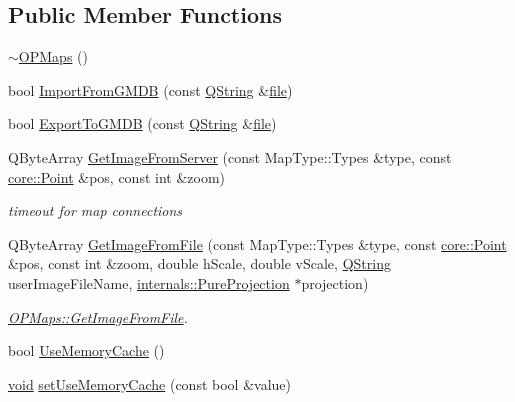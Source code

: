 \subsection*{\-Public \-Member \-Functions}
\begin{DoxyCompactItemize}
\item 
\hyperlink{group___o_p_map_widget_ga7f09b75dc945740e40b6c0fa28998c51}{$\sim$\-O\-P\-Maps} ()
\item 
bool \hyperlink{group___o_p_map_widget_ga50b468c09bac4de46905661839aa2477}{\-Import\-From\-G\-M\-D\-B} (const \hyperlink{group___u_a_v_objects_plugin_gab9d252f49c333c94a72f97ce3105a32d}{\-Q\-String} \&\hyperlink{uavobjecttemplate_8m_a97c04efa65bcf0928abf9260bc5cbf46}{file})
\item 
bool \hyperlink{group___o_p_map_widget_ga0e08ede04e7f73ba867d870516a3da12}{\-Export\-To\-G\-M\-D\-B} (const \hyperlink{group___u_a_v_objects_plugin_gab9d252f49c333c94a72f97ce3105a32d}{\-Q\-String} \&\hyperlink{uavobjecttemplate_8m_a97c04efa65bcf0928abf9260bc5cbf46}{file})
\item 
\-Q\-Byte\-Array \hyperlink{group___o_p_map_widget_ga03e1a814248920f31520f38e2ed5d412}{\-Get\-Image\-From\-Server} (const \-Map\-Type\-::\-Types \&type, const \hyperlink{structcore_1_1_point}{core\-::\-Point} \&pos, const int \&zoom)
\begin{DoxyCompactList}\small\item\em timeout for map connections \end{DoxyCompactList}\item 
\-Q\-Byte\-Array \hyperlink{group___o_p_map_widget_gae60565be4288e3fca3f28642b38d93ea}{\-Get\-Image\-From\-File} (const \-Map\-Type\-::\-Types \&type, const \hyperlink{structcore_1_1_point}{core\-::\-Point} \&pos, const int \&zoom, double h\-Scale, double v\-Scale, \hyperlink{group___u_a_v_objects_plugin_gab9d252f49c333c94a72f97ce3105a32d}{\-Q\-String} user\-Image\-File\-Name, \hyperlink{classinternals_1_1_pure_projection}{internals\-::\-Pure\-Projection} $\ast$projection)
\begin{DoxyCompactList}\small\item\em \hyperlink{group___o_p_map_widget_gae60565be4288e3fca3f28642b38d93ea}{\-O\-P\-Maps\-::\-Get\-Image\-From\-File}. \end{DoxyCompactList}\item 
bool \hyperlink{group___o_p_map_widget_ga2645fe8a750602f5aaa9258af2d7d63e}{\-Use\-Memory\-Cache} ()
\item 
\hyperlink{group___u_a_v_objects_plugin_ga444cf2ff3f0ecbe028adce838d373f5c}{void} \hyperlink{group___o_p_map_widget_ga87583d4fb36185a5b8275459e7703246}{set\-Use\-Memory\-Cache} (const bool \&value)

\end{DoxyCompactItemize}
